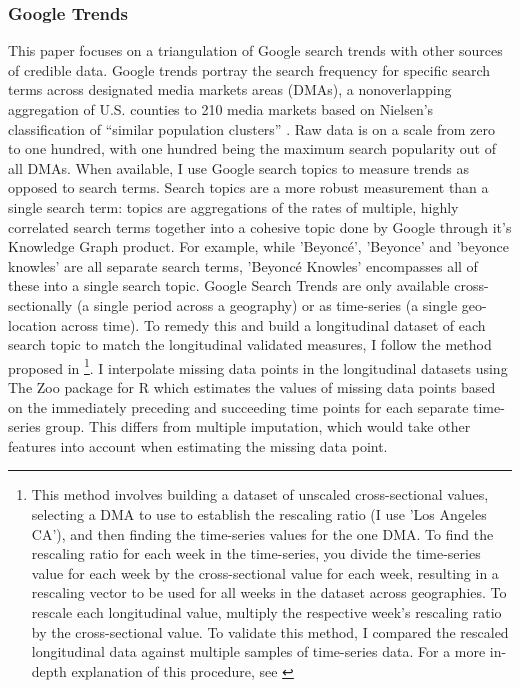 \subsubsection{Google Trends}
This paper focuses on a triangulation of Google search trends
\citep{googletrends} with other sources of credible data. Google trends portray
the search frequency for specific search terms across designated media markets
areas (DMAs), a nonoverlapping aggregation of U.S. counties to 210 media markets
based on Nielsen's classification of ``similar population clusters''
\citep{dma_key}. Raw data is on a scale from zero to one hundred, with one
hundred being the maximum search popularity out of all DMAs. When available, I
use Google search topics to measure trends as opposed to search terms. Search
topics are a more robust measurement than a single search term: topics are
aggregations of the rates of multiple, highly correlated search terms together
into a cohesive topic done by Google through it's Knowledge Graph product. For
example, while 'Beyoncé', 'Beyonce' and 'beyonce knowles' are all separate
search terms, 'Beyoncé Knowles' encompasses all of these into a single search
topic. Google Search Trends are only available cross-sectionally (a single
period across a geography) or as time-series (a single geo-location across
time). To remedy this and build a longitudinal dataset of each search topic to
match the longitudinal validated measures, I follow the method proposed in
\citet[][p. 5]{park_etal}\footnote{This method involves building a dataset of
unscaled cross-sectional values, selecting a DMA to use to establish the
rescaling ratio (I use 'Los Angeles CA'), and then finding the time-series
values for the one DMA. To find the rescaling ratio for each week in the
time-series, you divide the time-series value for each week by the
cross-sectional value for each week, resulting in a rescaling vector to be used
for all weeks in the dataset across geographies. To rescale each longitudinal
value, multiply the respective week's rescaling ratio by the cross-sectional
value. To validate this method, I compared the rescaled longitudinal data
against multiple samples of time-series data. For a more in-depth explanation of
this procedure, see \citet[p. 5]{park_etal}}. I interpolate missing data points
in the longitudinal datasets using The Zoo package for R \citep{zoo} which estimates
the values of missing data points based on the immediately preceding and succeeding
time points for each separate time-series group. This differs from multiple imputation, 
which would take other features into account when estimating the missing data point. 

